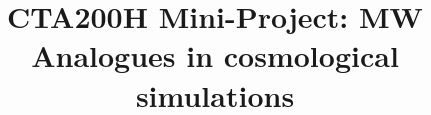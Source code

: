\documentclass[linenumbers,trackchanges]{aastex7}
\begin{document}
\title{CTA200H Mini-Project: MW Analogues in cosmological simulations}

\end{document}
